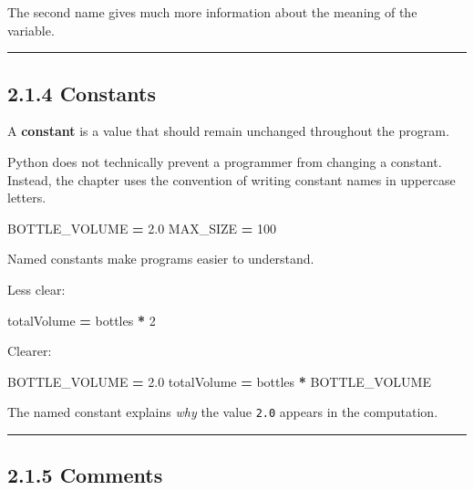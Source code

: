 \documentclass[
]{article}
\newenvironment{Shaded}{\begin{snugshade}}{\end{snugshade}}
\newcommand{\DecValTok}[1]{\textcolor[rgb]{0.00,0.00,0.81}{#1}}
\newcommand{\FloatTok}[1]{\textcolor[rgb]{0.00,0.00,0.81}{#1}}
\newcommand{\NormalTok}[1]{#1}
\newcommand{\OperatorTok}[1]{\textcolor[rgb]{0.81,0.36,0.00}{\textbf{#1}}}
\begin{document}
The second name gives much more information about the meaning of the
variable.

\begin{center}\rule{0.5\linewidth}{0.5pt}\end{center}

\subsection{2.1.4 Constants}\label{constants}

A \textbf{constant} is a value that should remain unchanged throughout
the program.

Python does not technically prevent a programmer from changing a
constant. Instead, the chapter uses the convention of writing constant
names in uppercase letters.

\begin{Shaded}
\begin{Highlighting}[]
\NormalTok{BOTTLE\_VOLUME }\OperatorTok{=} \FloatTok{2.0}
\NormalTok{MAX\_SIZE }\OperatorTok{=} \DecValTok{100}
\end{Highlighting}
\end{Shaded}

Named constants make programs easier to understand.

Less clear:

\begin{Shaded}
\begin{Highlighting}[]
\NormalTok{totalVolume }\OperatorTok{=}\NormalTok{ bottles }\OperatorTok{*} \DecValTok{2}
\end{Highlighting}
\end{Shaded}

Clearer:

\begin{Shaded}
\begin{Highlighting}[]
\NormalTok{BOTTLE\_VOLUME }\OperatorTok{=} \FloatTok{2.0}
\NormalTok{totalVolume }\OperatorTok{=}\NormalTok{ bottles }\OperatorTok{*}\NormalTok{ BOTTLE\_VOLUME}
\end{Highlighting}
\end{Shaded}

The named constant explains \emph{why} the value \texttt{2.0} appears in
the computation.

\begin{center}\rule{0.5\linewidth}{0.5pt}\end{center}

\subsection{2.1.5 Comments}\label{comments}
\end{document}
